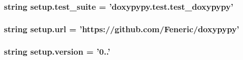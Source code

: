\hypertarget{namespacesetup_aaedcd7e0bf209e42aef838657a6bba4a}{
\subsubsection[{test\-\_\-suite}]{\setlength{\rightskip}{0pt plus 5cm}string setup.\-test\-\_\-suite = 'doxypypy.\-test.\-test\-\_\-doxypypy'}}\label{namespacesetup_aaedcd7e0bf209e42aef838657a6bba4a}
\hypertarget{namespacesetup_a3376e8b9735800b5b9e455914cee908d}{
\subsubsection[{url}]{\setlength{\rightskip}{0pt plus 5cm}string setup.\-url = 'https\-://github.\-com/Feneric/doxypypy'}}\label{namespacesetup_a3376e8b9735800b5b9e455914cee908d}
\hypertarget{namespacesetup_ab177531e7a80674a3db3de2d79eb8be7}{
\subsubsection[{version}]{\setlength{\rightskip}{0pt plus 5cm}string setup.\-version = '0..'}}\label{namespacesetup_ab177531e7a80674a3db3de2d79eb8be7}
